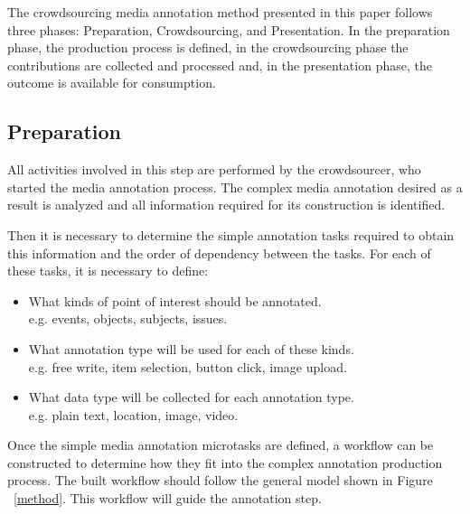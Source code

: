 The crowdsourcing media annotation method presented in this paper follows three phases: Preparation, Crowdsourcing, and Presentation. In the preparation phase, the production process is defined, in the crowdsourcing phase the contributions are collected and processed and, in the presentation phase, the outcome is available for consumption.

\subsection{Preparation} 
All activities involved in this step are performed by the crowdsourcer, who started the media annotation process. The complex media annotation desired as a result is analyzed and all information required for its construction is identified.

Then it is necessary to determine the simple annotation tasks required to obtain this information and the order of dependency between the tasks. For each of these tasks, it is necessary to define:
\begin{itemize}
\item What kinds of point of interest should be annotated.\\e.g. events, objects, subjects, issues.
\item What annotation type will be used for each of these kinds.\\e.g. free write, item selection, button click, image upload.
\item What data type will be collected for each annotation type.\\e.g. plain text, location, image, video.
\end{itemize}


Once the simple media annotation microtasks are defined, a workflow can be constructed to determine how they fit into the complex annotation production process. The built workflow should follow the general model shown in Figure ~\ref{method}. This workflow will guide the annotation step.

